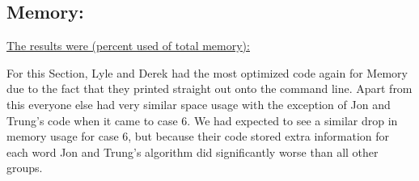 \documentclass[12pt]{article}
\begin{document}
\subsection{Memory:}
\underline{The results were (percent used of total memory):}
\begin{table}[H]
    \centering
\end{table}
For this Section, Lyle and Derek had the most optimized code again for Memory due to the fact that
they printed straight out onto the command line. Apart from this everyone else had very similar
space usage with the exception of Jon and Trung's code when it came to case 6. We had expected to see a similar drop
in memory usage for case 6, but because their code stored extra information for each word Jon and Trung's
algorithm did significantly worse than all other groups.
\end{document}
